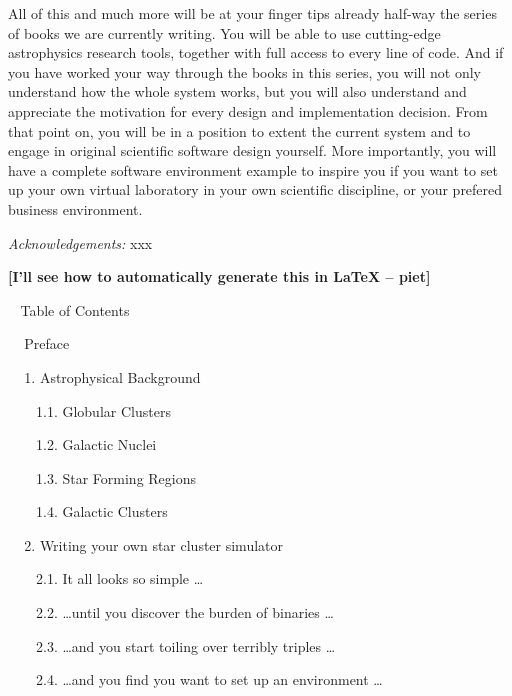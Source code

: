 \documentclass{book}
\def\piet#1{{\bf[#1 -- piet]}}
\begin{document}
All of this and much more will be at your finger tips already half-way
the series of books we are currently writing.  You will be able to use
cutting-edge astrophysics research tools, together with full access to
every line of code.  And if you have worked your way through the books
in this series, you will not only understand how the whole system works,
but you will also understand and appreciate the motivation for every
design and implementation decision.  From that point on, you will be
in a position to extent the current system and to engage in original
scientific software design yourself.  More importantly, you will have
a complete software environment example to inspire you if you want to
set up your own virtual laboratory in your own scientific discipline,
or your prefered business environment.

\bigskip
\bigskip
{\it Acknowledgements:}
xxx

\newpage
%
%
\parskip 0pt
%
%

\piet{I'll see how to automatically generate this in LaTeX}

\medskip
\medskip

{\lgb $\;\;$ Table of Contents}

\medskip

$\;\;\;$ Preface

\smallskip

$\;\;\;$ 1. Astrophysical Background

$\;\;\;\;\;\;$ 1.1. Globular Clusters

$\;\;\;\;\;\;$ 1.2. Galactic Nuclei

$\;\;\;\;\;\;$ 1.3. Star Forming Regions

$\;\;\;\;\;\;$ 1.4. Galactic Clusters

\smallskip

$\;\;\;$ 2. Writing your own star cluster simulator

$\;\;\;\;\;\;$ 2.1. It all looks so simple \dots

$\;\;\;\;\;\;$ 2.2. \dots until you discover the burden of binaries \dots

$\;\;\;\;\;\;$ 2.3. \dots and you start toiling over terribly triples \dots

$\;\;\;\;\;\;$ 2.4. \dots and you find you want to set up an environment \dots
\end{document}
